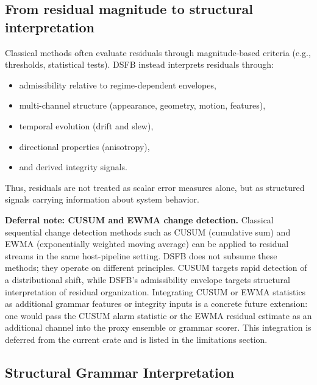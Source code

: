 \documentclass[11pt,letterpaper]{article}
\theoremstyle{gcresult}
\theoremstyle{definition}
\newenvironment{remarkbox}{%
  \begin{tcolorbox}[claimbox]%
}{%
  \end{tcolorbox}%
}
\begin{document}
\subsection{From residual magnitude to structural interpretation}

Classical methods often evaluate residuals through magnitude-based criteria (e.g., thresholds, statistical tests). DSFB instead interprets residuals through:
\begin{itemize}[leftmargin=1.5em]
    \item admissibility relative to regime-dependent envelopes,
    \item multi-channel structure (appearance, geometry, motion, features),
    \item temporal evolution (drift and slew),
    \item directional properties (anisotropy),
    \item and derived integrity signals.
\end{itemize}

Thus, residuals are not treated as scalar error measures alone, but as structured signals carrying information about system behavior.

\begin{remarkbox}
\textbf{Deferral note: CUSUM and EWMA change detection.}
Classical sequential change detection methods such as CUSUM (cumulative sum) and EWMA (exponentially weighted moving average) can be applied to residual streams in the same host-pipeline setting. DSFB does not subsume these methods; they operate on different principles. CUSUM targets rapid detection of a distributional shift, while DSFB's admissibility envelope targets structural interpretation of residual organization. Integrating CUSUM or EWMA statistics as additional grammar features or integrity inputs is a concrete future extension: one would pass the CUSUM alarm statistic or the EWMA residual estimate as an additional channel into the proxy ensemble or grammar scorer. This integration is deferred from the current crate and is listed in the limitations section.
\end{remarkbox}



\subsection{Structural Grammar Interpretation}
\end{document}
